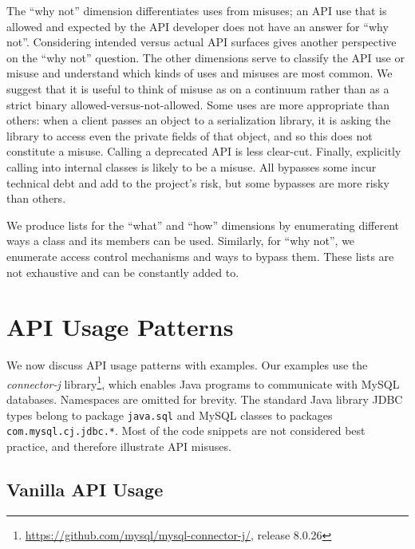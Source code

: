 The ``why not'' dimension differentiates uses from misuses; an API use that is allowed and expected by the API developer does not have an answer for ``why not''. Considering intended versus actual API surfaces gives another
perspective on the ``why not'' question. The other dimensions serve to classify the API use or misuse and understand which kinds of uses and misuses are most common. We suggest that it is useful to think of misuse as on a
continuum rather than as a strict binary allowed-versus-not-allowed.
Some uses are more appropriate than others: when a
client passes an object to a serialization library, it is asking
the library to access even the private fields of that object, and so this
does not constitute a misuse. Calling a deprecated API is less clear-cut.
Finally, explicitly calling into internal classes is likely to be a misuse.
All bypasses some incur technical debt and add to the project's risk,
but some bypasses are more risky than others.

We produce lists for the ``what'' and ``how'' dimensions by enumerating different ways a class and its members can be used. Similarly, for ``why not'', we enumerate access control mechanisms and ways to bypass them. These lists are not exhaustive and can be constantly added to.

\section{API Usage Patterns}
\label{sec:patterns}

We now discuss API usage patterns with examples. Our examples use the \textit{connector-j} library\footnote{\url{https://github.com/mysql/mysql-connector-j/}, release 8.0.26}, which enables Java programs to communicate with MySQL databases. Namespaces are omitted for brevity. The standard Java library JDBC types belong to package \texttt{java.sql} and MySQL classes to packages \texttt{com.mysql.cj.jdbc.*}. Most of the code snippets are not considered best practice, and therefore illustrate API misuses.

\subsection{Vanilla API Usage}


